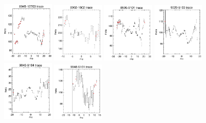 \documentclass[fleqn,usenatbib]{mnras}
\begin{document}
\begin{figure}
    \centering
    \includegraphics[width=0.23\textwidth]{Images/SN1-MC250/CPSB-CTRLs/8945-12703-1-250.png}
    \includegraphics[width=0.23\textwidth]{Images/SN1-MC250/CPSB-CTRLs/8992-1902-1-250.png}
    \includegraphics[width=0.23\textwidth]{Images/SN1-MC250/CPSB-CTRLs/8995-9101-1-250.png}
    \includegraphics[width=0.23\textwidth]{Images/SN1-MC250/CPSB-CTRLs/9029-6103-1-250.png}
    \includegraphics[width=0.23\textwidth]{Images/SN1-MC250/CPSB-CTRLs/9043-6104-1-250.png}
    \includegraphics[width=0.23\textwidth]{Images/SN1-MC250/CPSB-CTRLs/9048-6101-1-250.png}

\end{figure}
\end{document}
